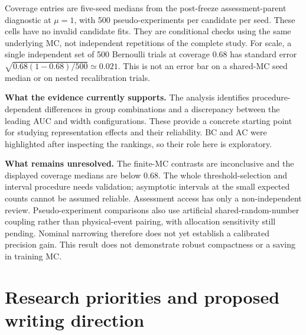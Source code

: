 \documentclass[11pt,a4paper]{article}
\begin{document}
Coverage entries are five-seed medians from the post-freeze assessment-parent
diagnostic at $\mu=1$, with 500 pseudo-experiments per candidate per seed.
These cells have no invalid candidate fits. They are conditional checks using
the same underlying MC, not independent repetitions of the complete study.
For scale, a single independent set of 500 Bernoulli trials at coverage 0.68
has standard error $\sqrt{0.68(1-0.68)/500}\simeq0.021$.
This is not an error bar on a shared-MC seed median or on nested recalibration
trials.

\textbf{What the evidence currently supports.}
The analysis identifies procedure-dependent differences in group combinations
and a discrepancy between the leading AUC and width configurations. These
provide a concrete starting point for studying representation effects and
their reliability. BC and AC were highlighted after inspecting the rankings,
so their role here is exploratory.

\textbf{What remains unresolved.}
The finite-MC contrasts are inconclusive and the displayed coverage medians
are below 0.68. The whole threshold-selection and interval procedure needs
validation; asymptotic intervals at the small expected counts cannot be assumed
reliable. Assessment access has only a non-independent review. Pseudo-experiment
comparisons also use artificial shared-random-number coupling rather than
physical-event pairing, with allocation sensitivity still pending.
Nominal narrowing therefore does not yet establish a calibrated precision gain.
This result does not demonstrate robust compactness or a saving in training MC.

\newpage
\section{Research priorities and proposed writing direction}
\end{document}
